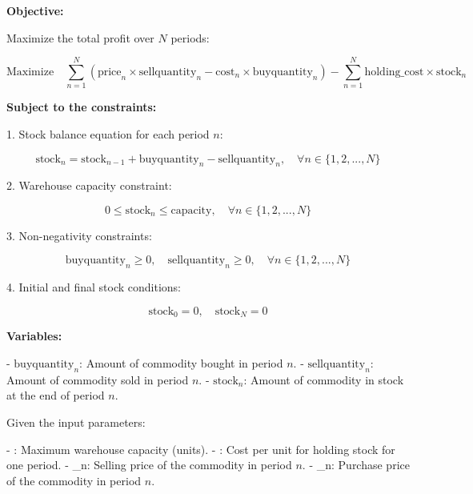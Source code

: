 \documentclass{article}
\begin{document}
\textbf{Objective:}

Maximize the total profit over $N$ periods:

\[
\text{Maximize} \quad \sum_{n=1}^{N} \left( \text{price}_n \times \text{sellquantity}_n - \text{cost}_n \times \text{buyquantity}_n \right) - \sum_{n=1}^{N} \text{holding\_cost} \times \text{stock}_n
\]

\textbf{Subject to the constraints:}

1. Stock balance equation for each period $n$:

\[
\text{stock}_n = \text{stock}_{n-1} + \text{buyquantity}_n - \text{sellquantity}_n, \quad \forall n \in \{1, 2, ..., N\}
\]

2. Warehouse capacity constraint:

\[
0 \leq \text{stock}_n \leq \text{capacity}, \quad \forall n \in \{1, 2, ..., N\}
\]

3. Non-negativity constraints:

\[
\text{buyquantity}_n \geq 0, \quad \text{sellquantity}_n \geq 0, \quad \forall n \in \{1, 2, ..., N\}
\]

4. Initial and final stock conditions:

\[
\text{stock}_0 = 0, \quad \text{stock}_N = 0
\]

\textbf{Variables:}

- $\text{buyquantity}_n$: Amount of commodity bought in period $n$.
- $\text{sellquantity}_n$: Amount of commodity sold in period $n$.
- $\text{stock}_n$: Amount of commodity in stock at the end of period $n$.

Given the input parameters:

- : Maximum warehouse capacity (units).
- : Cost per unit for holding stock for one period.
- _n: Selling price of the commodity in period $n$.
- _n: Purchase price of the commodity in period $n$.
\end{document}
